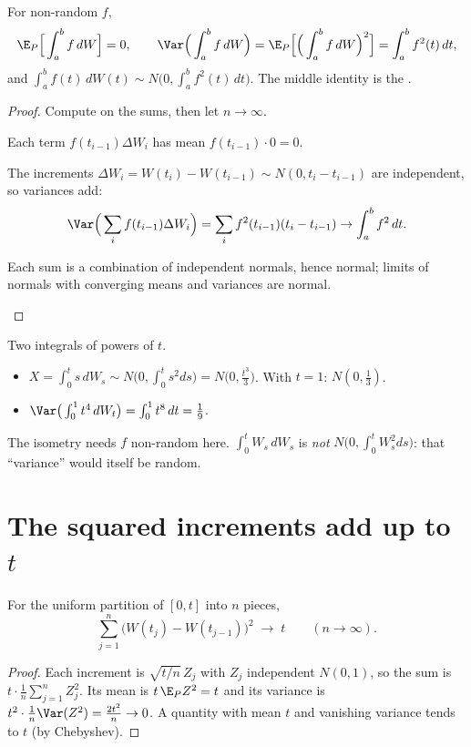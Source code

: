\begin{theorem}
\label{thm:isometry}
For non-random $f$,
\[
  \E_P\Big[\int_a^bf\,dW\Big]=0,\qquad
  \Var\Big(\int_a^bf\,dW\Big)=\E_P\Big[\Big(\int_a^bf\,dW\Big)^2\Big]=\int_a^bf^2(t)\,dt,
\]
and $\displaystyle\int_a^bf(t)\,dW(t)\sim N\Big(0,\int_a^bf^2(t)\,dt\Big)$. The middle identity is the .
\end{theorem}
\begin{proof}
Compute on the sums, then let $n\to\infty$.
\begin{steps}
  \item Each term $f(t_{i-1})\Delta W_i$ has mean $f(t_{i-1})\cdot0=0$.
  \item The increments $\Delta W_i=W(t_i)-W(t_{i-1})\sim N(0,t_i-t_{i-1})$ are independent, so variances add:
  \[
    \Var\Big(\sum_if(t_{i-1})\Delta W_i\Big)=\sum_if^2(t_{i-1})(t_i-t_{i-1})\to\int_a^bf^2\,dt .
  \]
  \item Each sum is a combination of independent normals, hence normal; limits of normals with converging means and variances are normal. \qedhere
\end{steps}
\end{proof}

\begin{example}
\label{ex:ito-dist}
Two integrals of powers of $t$.
\begin{itemize}
  \item $X=\int_0^ts\,dW_s\sim N\big(0,\int_0^ts^2ds\big)=N\big(0,\frac{t^3}{3}\big)$. With $t=1$: $N(0,\frac13)$.
  \item $\Var\big(\int_0^1t^4\,dW_t\big)=\int_0^1t^8\,dt=\frac19$.
\end{itemize}
\end{example}

The isometry needs $f$ non-random here. $\int_0^tW_s\,dW_s$ is \emph{not} $N\big(0,\int_0^tW_s^2ds\big)$: that ``variance'' would itself be random.

\section{The squared increments add up to \texorpdfstring{$t$}{t}}

\begin{theorem}
\label{thm:qv}
For the uniform partition of $[0,t]$ into $n$ pieces,
\[
  \sum_{j=1}^n\big(W(t_j)-W(t_{j-1})\big)^2\;\longrightarrow\;t\qquad(n\to\infty).
\]
\end{theorem}
\begin{proof}
Each increment is $\sqrt{t/n}\,Z_j$ with $Z_j$ independent $N(0,1)$, so the sum is $t\cdot\frac1n\sum_{j=1}^nZ_j^2$. Its mean is $t\,\E_PZ^2=t$ and its variance is $t^2\cdot\frac1n\Var(Z^2)=\frac{2t^2}{n}\to0$. A quantity with mean $t$ and vanishing variance tends to $t$ (by Chebyshev).
\end{proof}

